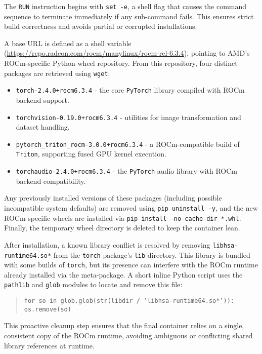 The \texttt{RUN} instruction begins with \texttt{set -e}, a shell flag that causes the command sequence to terminate immediately if any sub-command fails. This ensures strict build correctness and avoids partial or corrupted installations.

A base URL is defined as a shell variable (\url{https://repo.radeon.com/rocm/manylinux/rocm-rel-6.3.4}), pointing to AMD’s ROCm-specific Python wheel repository. From this repository, four distinct packages are retrieved using \texttt{wget}:

\begin{itemize}
	\item \texttt{torch-2.4.0+rocm6.3.4} - the core \texttt{PyTorch} library compiled with ROCm backend support.
	\item \texttt{torchvision-0.19.0+rocm6.3.4} - utilities for image transformation and dataset handling.
	\item \texttt{pytorch\_triton\_rocm-3.0.0+rocm6.3.4} - a ROCm-compatible build of \texttt{Triton}, supporting fused GPU kernel execution.
	\item \texttt{torchaudio-2.4.0+rocm6.3.4} - the \texttt{PyTorch} audio library with ROCm backend compatibility.
\end{itemize}

Any previously installed versions of these packages (including possible incompatible system defaults) are removed using \texttt{pip uninstall -y}, and the new ROCm-specific wheels are installed via \texttt{pip install --no-cache-dir *.whl}. Finally, the temporary wheel directory is deleted to keep the container lean.

After installation, a known library conflict is resolved by removing \texttt{libhsa-runtime64.so*} from the \texttt{torch} package’s \texttt{lib} directory. This library is bundled with some builds of \texttt{torch}, but its presence can interfere with the ROCm runtime already installed via the meta-package. A short inline Python script uses the \texttt{pathlib} and \texttt{glob} modules to locate and remove this file:

\begin{quote}
	\texttt{for so in glob.glob(str(libdir / 'libhsa-runtime64.so*')): os.remove(so)}
\end{quote}

This proactive cleanup step ensures that the final container relies on a single, consistent copy of the ROCm runtime, avoiding ambiguous or conflicting shared library references at runtime.

